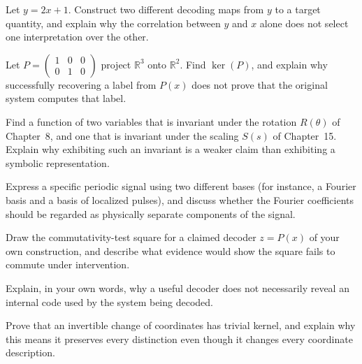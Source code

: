 \begin{exercise}
Let $y = 2x+1$. Construct two different decoding maps from $y$ to a
target quantity, and explain why the correlation between $y$ and $x$
alone does not select one interpretation over the other.
\end{exercise}

\begin{exercise}
Let $P = \begin{pmatrix} 1 & 0 & 0 \\ 0 & 1 & 0 \end{pmatrix}$ project
$\mathbb{R}^3$ onto $\mathbb{R}^2$. Find $\ker(P)$, and explain why
successfully recovering a label from $P(x)$ does not prove that the
original system computes that label.
\end{exercise}

\begin{exercise}
Find a function of two variables that is invariant under the rotation
$R(\theta)$ of Chapter~8, and one that is invariant under the scaling
$S(s)$ of Chapter~15. Explain why exhibiting such an invariant is a
weaker claim than exhibiting a symbolic representation.
\end{exercise}

\begin{exercise}
Express a specific periodic signal using two different bases (for
instance, a Fourier basis and a basis of localized pulses), and discuss
whether the Fourier coefficients should be regarded as physically
separate components of the signal.
\end{exercise}

\begin{exercise}
Draw the commutativity-test square for a claimed decoder $z = P(x)$ of
your own construction, and describe what evidence would show the square
fails to commute under intervention.
\end{exercise}

\begin{exercise}
Explain, in your own words, why a useful decoder does not necessarily
reveal an internal code used by the system being decoded.
\end{exercise}

\begin{exercise}
Prove that an invertible change of coordinates has trivial kernel, and
explain why this means it preserves every distinction even though it
changes every coordinate description.
\end{exercise}

